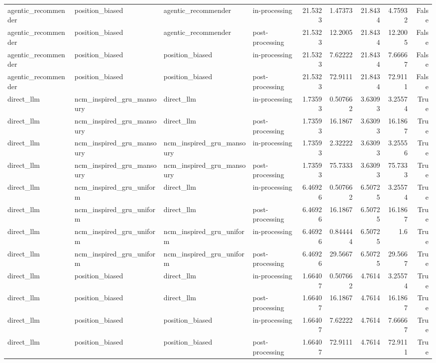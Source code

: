 \begin{table}[htbp!]
\begin{tabular}{llllrrrrr}
agentic\_recommender & position\_biased & agentic\_recommender & in-processing & 21.5323 & 1.47373 & 21.8434 & 4.75932 & False \\
agentic\_recommender & position\_biased & agentic\_recommender & post-processing & 21.5323 & 12.2005 & 21.8434 & 12.2005 & False \\
agentic\_recommender & position\_biased & position\_biased & in-processing & 21.5323 & 7.62222 & 21.8434 & 7.66667 & False \\
agentic\_recommender & position\_biased & position\_biased & post-processing & 21.5323 & 72.9111 & 21.8434 & 72.9111 & False \\
direct\_llm & ncm\_inspired\_gru\_mansoury & direct\_llm & in-processing & 1.73593 & 0.507662 & 3.63093 & 3.25574 & True \\
direct\_llm & ncm\_inspired\_gru\_mansoury & direct\_llm & post-processing & 1.73593 & 16.1867 & 3.63093 & 16.1867 & True \\
direct\_llm & ncm\_inspired\_gru\_mansoury & ncm\_inspired\_gru\_mansoury & in-processing & 1.73593 & 2.32222 & 3.63093 & 3.25556 & True \\
direct\_llm & ncm\_inspired\_gru\_mansoury & ncm\_inspired\_gru\_mansoury & post-processing & 1.73593 & 75.7333 & 3.63093 & 75.7333 & True \\
direct\_llm & ncm\_inspired\_gru\_uniform & direct\_llm & in-processing & 6.46926 & 0.507662 & 6.50725 & 3.25574 & True \\
direct\_llm & ncm\_inspired\_gru\_uniform & direct\_llm & post-processing & 6.46926 & 16.1867 & 6.50725 & 16.1867 & True \\
direct\_llm & ncm\_inspired\_gru\_uniform & ncm\_inspired\_gru\_uniform & in-processing & 6.46926 & 0.844444 & 6.50725 & 1.6 & True \\
direct\_llm & ncm\_inspired\_gru\_uniform & ncm\_inspired\_gru\_uniform & post-processing & 6.46926 & 29.5667 & 6.50725 & 29.5667 & True \\
direct\_llm & position\_biased & direct\_llm & in-processing & 1.66407 & 0.507662 & 4.7614 & 3.25574 & True \\
direct\_llm & position\_biased & direct\_llm & post-processing & 1.66407 & 16.1867 & 4.7614 & 16.1867 & True \\
direct\_llm & position\_biased & position\_biased & in-processing & 1.66407 & 7.62222 & 4.7614 & 7.66667 & True \\
direct\_llm & position\_biased & position\_biased & post-processing & 1.66407 & 72.9111 & 4.7614 & 72.9111 & True \\

\end{tabular}
\end{table}
